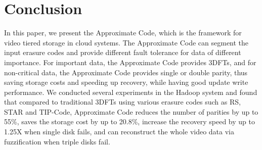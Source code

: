 \documentclass[sigconf]{acmart}
\begin{document}
\section{Conclusion}\label{Conclusion}
In this paper, we present the Approximate Code, which is the framework for video tiered storage in cloud systems. The Approximate Code can segment the input erasure codes and provide different fault tolerance for data of different importance. For important data, the Approximate Code provides 3DFTs, and for non-critical data, the Approximate Code provides single or double parity, thus saving storage costs and speeding up recovery, while having good update write performance. We conducted several experiments in the Hadoop system and found that compared to traditional 3DFTs using various erasure codes such as RS, STAR and TIP-Code, Approximate Code reduces the number of parities by up to 55\%, saves the storage cost by up to 20.8\%, increase the recovery speed by up to 1.25X when single disk fails, and can reconstruct the whole video data via fuzzification when triple disks fail.

\begin{acks}

\end{acks}



\end{document}
